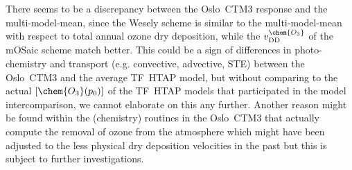 \documentclass[gmd, manuscript]{copernicus}
\begin{document}
There seems to be a discrepancy between the Oslo~CTM3 response and the multi-model-mean, since the Wesely scheme is similar to the multi-model-mean with respect to total annual ozone dry deposition, while the $v_\text{DD}^\chem{O_3}$ of the mOSaic scheme match better. This could be a sign of differences in photo-chemistry and transport (e.g. convective, advective, STE) between the Oslo~CTM3 and the average TF~HTAP model, but without comparing to the actual $[\chem{O_3}(p_0)]$ of the TF~HTAP models that participated in the model intercomparison, we cannot elaborate on this any further. Another reason might be found within the (chemistry) routines in the Oslo~CTM3 that actually compute the removal of ozone from the atmosphere which might have been adjusted to the less physical dry deposition velocities in the past but this is subject to further investigations.
\end{document}
